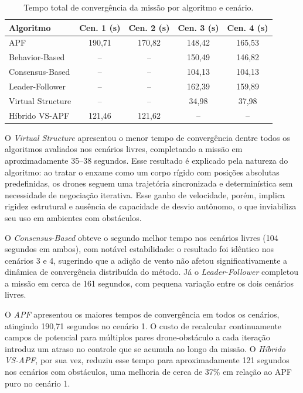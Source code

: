 \begin{table}[ht]
\centering
\caption{Tempo total de convergência da missão por algoritmo e cenário.}
\label{tab:tempo}
\footnotesize %
\setlength{\tabcolsep}{4pt} %
\begin{tabular}{|l|c|c|c|c|}
\hline
\textbf{Algoritmo} & \textbf{Cen. 1 (s)} & \textbf{Cen. 2 (s)} & \textbf{Cen. 3 (s)} & \textbf{Cen. 4 (s)} \\ \hline
APF & 190,71 & 170,82 & 148,42 & 165,53 \\ \hline
Behavior-Based & -- & -- & 150,49 & 146,82 \\ \hline
Consensus-Based & -- & -- & 104,13 & 104,13 \\ \hline
Leader-Follower & -- & -- & 162,39 & 159,89 \\ \hline
Virtual Structure & -- & -- & 34,98 & 37,98 \\ \hline
Híbrido VS-APF & 121,46 & 121,62 & -- & -- \\ \hline
\end{tabular}
\end{table}

O \textit{Virtual Structure} apresentou o menor tempo de convergência dentre todos os algoritmos avaliados nos cenários livres, completando a missão em aproximadamente 35--38 segundos. Esse resultado é explicado pela natureza do algoritmo: ao tratar o enxame como um corpo rígido com posições absolutas predefinidas, os drones seguem uma trajetória sincronizada e determinística sem necessidade de negociação iterativa. Esse ganho de velocidade, porém, implica rigidez estrutural e ausência de capacidade de desvio autônomo, o que inviabiliza seu uso em ambientes com obstáculos.

O \textit{Consensus-Based} obteve o segundo melhor tempo nos cenários livres (104 segundos em ambos), com notável estabilidade: o resultado foi idêntico nos cenários 3 e 4, sugerindo que a adição de vento não afetou significativamente a dinâmica de convergência distribuída do método. Já o \textit{Leader-Follower} completou a missão em cerca de 161 segundos, com pequena variação entre os dois cenários livres.

O \textit{APF} apresentou os maiores tempos de convergência em todos os cenários, atingindo 190,71 segundos no cenário 1. O custo de recalcular continuamente campos de potencial para múltiplos pares drone-obstáculo a cada iteração introduz um atraso no controle que se acumula ao longo da missão. O \textit{Híbrido VS-APF}, por sua vez, reduziu esse tempo para aproximadamente 121 segundos nos cenários com obstáculos, uma melhoria de cerca de 37\% em relação ao APF puro no cenário 1.

